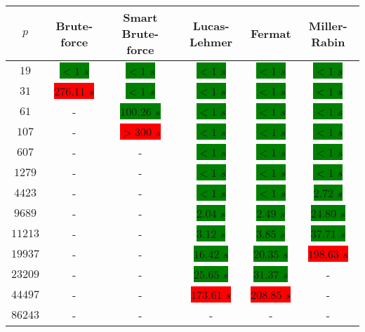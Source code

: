 \documentclass[main.tex]{subfiles}
\begin{document}
\begin{table}[ht!]
  \begin{tabular}{||c | c c c c c||}
    \hline
    $p$ & Brute-force & Smart Brute-force & Lucas-Lehmer & Fermat & Miller-Rabin  \\ [0.5ex] 
    \hline\hline
    $19$ & \colorbox{green}{$<1$ $s$} & \colorbox{green}{$<1$ $s$} & \colorbox{green}{$<1$ $s$} & \colorbox{green}{$<1$ $s$} & \colorbox{green}{$<1$ $s$}\\
    $31$ & \colorbox{red}{$276.11$ $s$} & \colorbox{green}{$<1$ $s$} & \colorbox{green}{$<1$ $s$} & \colorbox{green}{$<1$ $s$} & \colorbox{green}{$<1$ $s$}\\
    $61$ & - & \colorbox{green}{$100.26$ $s$} & \colorbox{green}{$<1$ $s$} & \colorbox{green}{$<1$ $s$} & \colorbox{green}{$<1$ $s$}\\
    $107$ & - & \colorbox{red}{$>300$ $s$} & \colorbox{green}{$<1$ $s$} & \colorbox{green}{$<1$ $s$} & \colorbox{green}{$<1$ $s$}\\
    $607$ & - & - & \colorbox{green}{$<1$ $s$} & \colorbox{green}{$<1$ $s$} & \colorbox{green}{$<1$ $s$}\\
    $1279$ & - & - & \colorbox{green}{$<1$ $s$} & \colorbox{green}{$<1$ $s$} & \colorbox{green}{$<1$ $s$}\\
    $4423$ & - & - & \colorbox{green}{$<1$ $s$} & \colorbox{green}{$<1$ $s$} & \colorbox{green}{$2.72$ $s$}\\
    $9689$ & - & - & \colorbox{green}{$2.04$ $s$} & \colorbox{green}{$2.49$ $s$} & \colorbox{green}{$24.80$ $s$}\\
    $11213$ & - & - & \colorbox{green}{$3.12$ $s$} & \colorbox{green}{$3.85$ $s$} & \colorbox{green}{$37.71$ $s$}\\
    $19937$ & - & - & \colorbox{green}{$16.42$ $s$} & \colorbox{green}{$20.35$ $s$} &  \colorbox{red}{$198.63$ $s$}\\
    $23209$ & - & - & \colorbox{green}{$25.65$ $s$} & \colorbox{green}{$31.37$ $s$} & -\\ 
    $44497$ & - & - & \colorbox{red}{$173.61$ $s$} &  \colorbox{red}{$208.85$ $s$} & -\\ 
    $86243$ & - & - & - & - & -\\  [1ex] 
    \hline
  \end{tabular}
\end{table}
\end{document}

